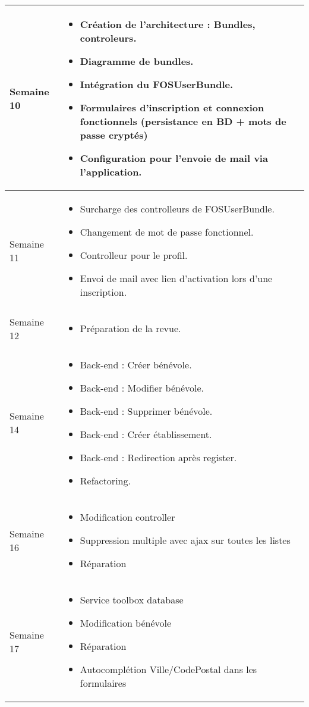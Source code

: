 \documentclass [a4paper] {article}
\begin{document}
\begin{longtable}{|>{\columncolor{gray!40}}p{2cm}|p{12cm}|}
	\hline
        Semaine 10 & \begin{itemize}
	\item Création de l'architecture : Bundles, controleurs. 
        \item Diagramme de bundles.
        \item Intégration du FOSUserBundle.
        \item Formulaires d'inscription et connexion fonctionnels (persistance en BD + mots de passe cryptés)
        \item Configuration pour l'envoie de mail via l'application.  
	\end{itemize} \\
	\hline
        Semaine 11 & \begin{itemize}
	\item Surcharge des controlleurs de FOSUserBundle. 
        \item Changement de mot de passe fonctionnel.
        \item Controlleur pour le profil.
        \item Envoi de mail avec lien d'activation lors d'une inscription.  
	\end{itemize} \\
	\hline
	Semaine 12 & \begin{itemize}
	\item Préparation de la revue.
	\end{itemize} \\
	\hline
	Semaine 14 & \begin{itemize}
	\item Back-end : Créer bénévole.
	\item Back-end : Modifier bénévole.
	\item Back-end : Supprimer bénévole.
	\item Back-end : Créer établissement.
	\item Back-end : Redirection après register.
	\item Refactoring.
	\end{itemize} \\
	\hline
	Semaine 16 & \begin{itemize}
	\item Modification controller
	\item Suppression multiple avec ajax sur toutes les listes
	\item Réparation
	\end{itemize} \\
	\hline
	Semaine 17 & \begin{itemize}
	\item Service toolbox database
	\item Modification bénévole
	\item Réparation
	\item Autocomplétion Ville/CodePostal dans les formulaires 
	\end{itemize} \\
	\hline
\end{longtable}
\end{document}
